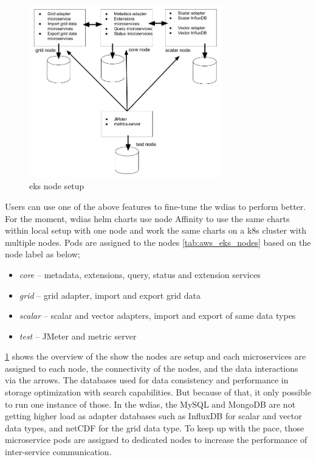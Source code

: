 \begin{figure}[htp]
    \centering
    \includegraphics[width=0.75\textwidth]{results/work_load/eks_node_setup.jpg}
    \caption{\acrfull{eks} node setup}
    \label{fi:eks_node_setup}
\end{figure}

Users can use one of the above features to fine-tune the \acrshort{wdias} to perform better. For the moment, \acrshort{wdias} helm charts use node Affinity to use the same charts within local setup with one node and work the same charts on a \acrshort{k8s} cluster with multiple nodes. Pods are assigned to the nodes \cref{tab:aws_eks_nodes} based on the node label as below;
\begin{itemize}
    \item \emph{core} -- metadata, extensions, query, status and extension services
    \item \emph{grid} -- grid adapter, import and export grid data
    \item \emph{scalar} -- scalar and vector adapters, import and export of same data types
    \item \emph{test} --  JMeter and metric server
\end{itemize}
\cref{fi:eks_node_setup} shows the overview of the show the nodes are setup and each microservices are assigned to each node, the connectivity of the nodes, and the data interactions via the arrows.
The databases used for data consistency and performance in storage optimization with search capabilities. But because of that, it only possible to run one instance of those. In the \acrshort{wdias}, the MySQL and MongoDB are not getting higher load as adapter databases such as InfluxDB for scalar and vector data types, and netCDF for the grid data type. To keep up with the pace, those microservice pods are assigned to dedicated nodes to increase the performance of inter-service communication.

